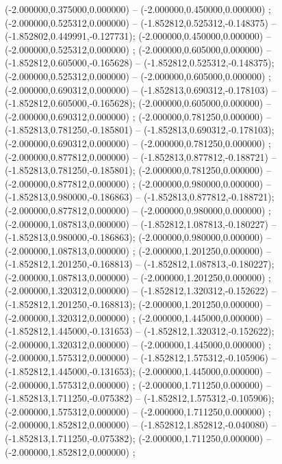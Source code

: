  (-2.000000,0.375000,0.000000) -- (-2.000000,0.450000,0.000000) ;
 (-2.000000,0.525312,0.000000) -- (-1.852812,0.525312,-0.148375) -- (-1.852802,0.449991,-0.127731);
 (-2.000000,0.450000,0.000000) -- (-2.000000,0.525312,0.000000) ;
 (-2.000000,0.605000,0.000000) -- (-1.852812,0.605000,-0.165628) -- (-1.852812,0.525312,-0.148375);
 (-2.000000,0.525312,0.000000) -- (-2.000000,0.605000,0.000000) ;
 (-2.000000,0.690312,0.000000) -- (-1.852813,0.690312,-0.178103) -- (-1.852812,0.605000,-0.165628);
 (-2.000000,0.605000,0.000000) -- (-2.000000,0.690312,0.000000) ;
 (-2.000000,0.781250,0.000000) -- (-1.852813,0.781250,-0.185801) -- (-1.852813,0.690312,-0.178103);
 (-2.000000,0.690312,0.000000) -- (-2.000000,0.781250,0.000000) ;
 (-2.000000,0.877812,0.000000) -- (-1.852813,0.877812,-0.188721) -- (-1.852813,0.781250,-0.185801);
 (-2.000000,0.781250,0.000000) -- (-2.000000,0.877812,0.000000) ;
 (-2.000000,0.980000,0.000000) -- (-1.852813,0.980000,-0.186863) -- (-1.852813,0.877812,-0.188721);
 (-2.000000,0.877812,0.000000) -- (-2.000000,0.980000,0.000000) ;
 (-2.000000,1.087813,0.000000) -- (-1.852812,1.087813,-0.180227) -- (-1.852813,0.980000,-0.186863);
 (-2.000000,0.980000,0.000000) -- (-2.000000,1.087813,0.000000) ;
 (-2.000000,1.201250,0.000000) -- (-1.852812,1.201250,-0.168813) -- (-1.852812,1.087813,-0.180227);
 (-2.000000,1.087813,0.000000) -- (-2.000000,1.201250,0.000000) ;
 (-2.000000,1.320312,0.000000) -- (-1.852812,1.320312,-0.152622) -- (-1.852812,1.201250,-0.168813);
 (-2.000000,1.201250,0.000000) -- (-2.000000,1.320312,0.000000) ;
 (-2.000000,1.445000,0.000000) -- (-1.852812,1.445000,-0.131653) -- (-1.852812,1.320312,-0.152622);
 (-2.000000,1.320312,0.000000) -- (-2.000000,1.445000,0.000000) ;
 (-2.000000,1.575312,0.000000) -- (-1.852812,1.575312,-0.105906) -- (-1.852812,1.445000,-0.131653);
 (-2.000000,1.445000,0.000000) -- (-2.000000,1.575312,0.000000) ;
 (-2.000000,1.711250,0.000000) -- (-1.852813,1.711250,-0.075382) -- (-1.852812,1.575312,-0.105906);
 (-2.000000,1.575312,0.000000) -- (-2.000000,1.711250,0.000000) ;
 (-2.000000,1.852812,0.000000) -- (-1.852812,1.852812,-0.040080) -- (-1.852813,1.711250,-0.075382);
 (-2.000000,1.711250,0.000000) -- (-2.000000,1.852812,0.000000) ;
